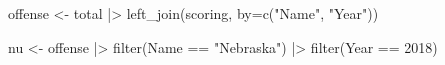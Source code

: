 \documentclass[
  letterpaper,
  DIV=11,
  numbers=noendperiod]{scrreprt}
\newenvironment{Shaded}{\begin{snugshade}}{\end{snugshade}}
\newcommand{\AttributeTok}[1]{\textcolor[rgb]{0.40,0.45,0.13}{#1}}
\newcommand{\DecValTok}[1]{\textcolor[rgb]{0.68,0.00,0.00}{#1}}
\newcommand{\FunctionTok}[1]{\textcolor[rgb]{0.28,0.35,0.67}{#1}}
\newcommand{\NormalTok}[1]{\textcolor[rgb]{0.00,0.23,0.31}{#1}}
\newcommand{\OtherTok}[1]{\textcolor[rgb]{0.00,0.23,0.31}{#1}}
\newcommand{\SpecialCharTok}[1]{\textcolor[rgb]{0.37,0.37,0.37}{#1}}
\newcommand{\StringTok}[1]{\textcolor[rgb]{0.13,0.47,0.30}{#1}}
\begin{document}
\begin{Shaded}
\begin{Highlighting}[]
\NormalTok{offense }\OtherTok{\textless{}{-}}\NormalTok{ total }\SpecialCharTok{|\textgreater{}} \FunctionTok{left\_join}\NormalTok{(scoring, }\AttributeTok{by=}\FunctionTok{c}\NormalTok{(}\StringTok{"Name"}\NormalTok{, }\StringTok{"Year"}\NormalTok{))}

\NormalTok{nu }\OtherTok{\textless{}{-}}\NormalTok{ offense }\SpecialCharTok{|\textgreater{}} \FunctionTok{filter}\NormalTok{(Name }\SpecialCharTok{==} \StringTok{"Nebraska"}\NormalTok{) }\SpecialCharTok{|\textgreater{}} \FunctionTok{filter}\NormalTok{(Year }\SpecialCharTok{==} \DecValTok{2018}\NormalTok{)}
\end{Highlighting}
\end{Shaded}
\end{document}
